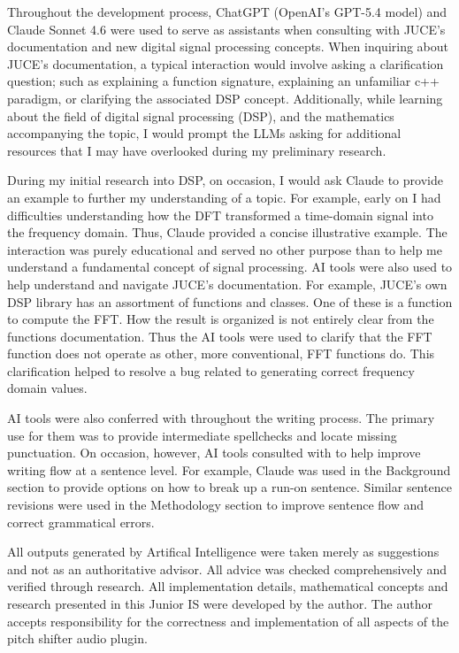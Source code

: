\documentclass[12pt]{article}
\begin{document}
Throughout the development process, ChatGPT (OpenAI's GPT-5.4 model) and Claude Sonnet 4.6 were used to serve as assistants when consulting with JUCE's documentation and new digital signal 
processing concepts. When inquiring about JUCE's documentation, a typical interaction would involve asking a clarification question; such as explaining a function signature, explaining an unfamiliar
c++ paradigm, or clarifying the associated DSP concept. Additionally, while learning about the field of digital signal processing (DSP), and the mathematics accompanying the topic, I would prompt the LLMs asking for 
additional resources that I may have overlooked during my preliminary research. 

During my initial research into DSP, on occasion, I would ask Claude to provide an example to further my understanding of a topic. For example, early on I had difficulties understanding how 
the DFT transformed a time-domain signal into the frequency domain. Thus, Claude provided a concise illustrative example. The interaction was purely educational and served no other purpose than to 
help me understand a fundamental concept of signal processing. 
AI tools were also used to help understand and navigate JUCE's documentation. For example, JUCE's own DSP library has an assortment of functions and classes. One of these is a function to 
compute the FFT. How the result is organized is not entirely clear from the functions documentation. Thus the AI tools were used to clarify that the FFT function does not operate as other, more conventional, 
FFT functions do. This clarification helped to resolve a bug related to generating correct frequency domain values. 

AI tools were also conferred with throughout the writing process. The primary use for them was to provide intermediate spellchecks and locate missing punctuation. On occasion, however, 
AI tools consulted with to help improve writing flow at a sentence level. For example, Claude was used in the Background section to provide options on how to break up a run-on sentence.
Similar sentence revisions were used in the Methodology section to improve sentence flow and correct grammatical errors. 

All outputs generated by Artifical Intelligence were taken merely as suggestions and not as an authoritative advisor. All advice was
checked comprehensively and verified through research. All implementation details, mathematical concepts and research presented in this Junior IS were developed
by the author. The author accepts responsibility for the correctness and implementation of all aspects of the pitch shifter audio plugin. 


\newpage


\end{document}
